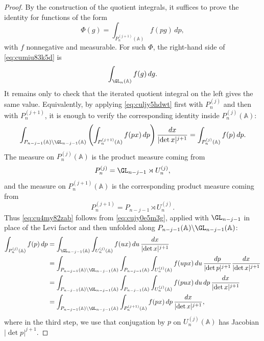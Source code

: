 \begin{proof}
  By the construction of the quotient integrals, it suffices to prove the identity for functions of the form
  \begin{equation*}
    \Phi(g)
    =
    \int_{P_n^{(j + 1)}(\mathbb{A})}
    f(p g)\, d p,
  \end{equation*}
  with $f$ nonnegative and measurable.  For such $\Phi$, the right-hand side of \eqref{eq:cumiu83k5d} is
  \begin{equation*}
    \int_{\GL_n(\mathbb{A})} f(g)\, d g.
  \end{equation*}
  It remains only to check that the iterated quotient integral on the left gives the same value.  Equivalently, by applying \eqref{eq:culjy5hdwt} first with $P_n^{(j)}$ and then with $P_n^{(j + 1)}$, it is enough to verify the corresponding identity inside $P_n^{(j)}(\mathbb{A})$:
  \begin{equation}\label{eq:cu4my82zab}
    \int_{P_{n - j - 1}(\mathbb{A}) \backslash \GL_{n - j - 1}(\mathbb{A})}
    \left(
      \int_{P_n^{(j + 1)}(\mathbb{A})}
      f(p x)\, d p
    \right)
    \frac{d x}{\lvert \det x \rvert^{j + 1}}
    =
    \int_{P_n^{(j)}(\mathbb{A})} f(p)\, d p.
  \end{equation}
  The measure on $P_n^{(j)}(\mathbb{A})$ is the product measure coming from
  \[
    P_n^{(j)} = \GL_{n - j - 1} \rtimes U_n^{(j)},
  \]
  and the measure on $P_n^{(j + 1)}(\mathbb{A})$ is the corresponding product measure coming from
  \[
    P_n^{(j + 1)} = P_{n - j - 1} \rtimes U_n^{(j)}.
  \]
  Thus \eqref{eq:cu4my82zab} follows from \eqref{eq:cujy0e5m3g}, applied with $\GL_{n - j - 1}$ in place of the Levi factor and then unfolded along $P_{n - j - 1}(\mathbb{A}) \backslash \GL_{n - j - 1}(\mathbb{A})$:
  \begin{align*}
    \int_{P_n^{(j)}(\mathbb{A})} f(p)\, d p
    &=
      \int_{\GL_{n - j - 1}(\mathbb{A})}
      \int_{U_n^{(j)}(\mathbb{A})}
      f(u x)\, d u\,
      \frac{d x}{\lvert \det x \rvert^{j + 1}}
    \\
    &=
      \int_{P_{n - j - 1}(\mathbb{A}) \backslash \GL_{n - j - 1}(\mathbb{A})}
      \int_{P_{n - j - 1}(\mathbb{A})}
      \int_{U_n^{(j)}(\mathbb{A})}
      f(u p x)\, d u\,
      \frac{d p}{\lvert \det p \rvert^{j + 1}}
      \frac{d x}{\lvert \det x \rvert^{j + 1}}
    \\
    &=
      \int_{P_{n - j - 1}(\mathbb{A}) \backslash \GL_{n - j - 1}(\mathbb{A})}
      \int_{P_{n - j - 1}(\mathbb{A})}
      \int_{U_n^{(j)}(\mathbb{A})}
      f(p u x)\, d u\, d p\,
      \frac{d x}{\lvert \det x \rvert^{j + 1}}
    \\
    &=
      \int_{P_{n - j - 1}(\mathbb{A}) \backslash \GL_{n - j - 1}(\mathbb{A})}
      \int_{P_n^{(j + 1)}(\mathbb{A})}
      f(p x)\, d p\,
      \frac{d x}{\lvert \det x \rvert^{j + 1}},
  \end{align*}
  where in the third step, we use that conjugation by $p$ on $U_n^{(j)}(\mathbb{A})$ has Jacobian $\lvert \det p \rvert^{j + 1}$.
\end{proof}

